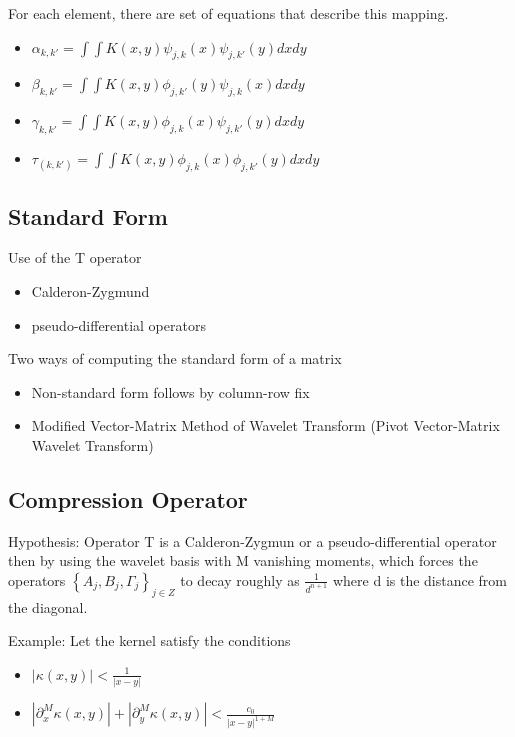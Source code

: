 \documentclass[11pt]{article}
\begin{document}
For each element, there are set of equations that describe this mapping.
\begin{itemize}
\item $\alpha _{k,k'} = \int \int K(x,y) \psi _{j,k} (x) \psi _{j,k'} (y) dxdy $
\item $\beta _{k,k'} = \int \int K(x,y) \phi _{j,k'} (y) \psi _{j,k} (x) dxdy $
\item $\gamma _{k,k'} = \int \int K(x,y) \phi _{j,k} (x) \psi _{j,k'} (y) dxdy $
\item $\tau _(k,k') = \int \int K(x,y) \phi _{j,k} (x) \phi _{j,k'} (y) dxdy $
\end{itemize}

\subsection {Standard Form}
Use of the T operator 
\begin{itemize}
\item Calderon-Zygmund
\item pseudo-differential operators
\end{itemize}

Two ways of computing the standard form of a matrix 
\begin{itemize}
\item Non-standard form follows by column-row fix
\item Modified Vector-Matrix Method of Wavelet Transform (Pivot Vector-Matrix Wavelet Transform)
\end{itemize}

\subsection {Compression Operator}
Hypothesis: Operator T is a Calderon-Zygmun or a pseudo-differential operator then by using the wavelet basis with M vanishing moments, which forces the operators $ 
 \left\{ 
 {A_j , B_j, \Gamma _j  } 
 \right\} 
  _{j\in Z } $
to decay roughly as $\frac{1}{d^{n+1}}$ where d is the distance from the diagonal.

Example: Let the kernel satisfy the conditions
\begin{itemize}
\item $|\kappa (x,y)| < \frac{1}{|x-y|} $
\item $|\partial ^M _x \kappa (x,y)| + |\partial ^M _y \kappa (x,y)| < \frac{c_0}{|x-y|^{1+M}}$
\end{itemize}
\end{document}
